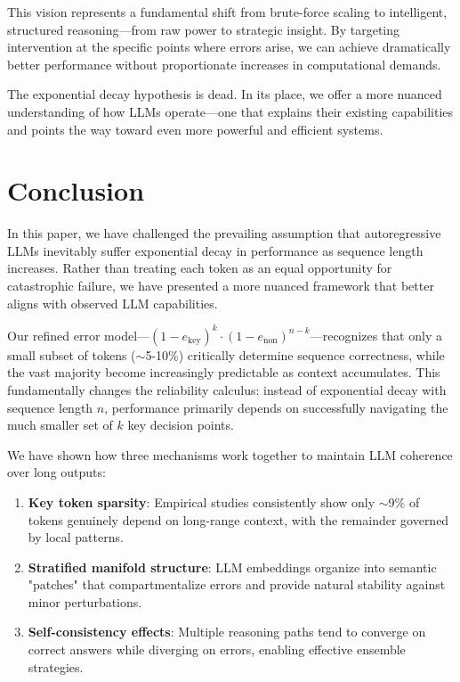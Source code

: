 \documentclass{article}
\begin{document}
This vision represents a fundamental shift from brute-force scaling to intelligent, structured reasoning—from raw power to strategic insight. By targeting intervention at the specific points where errors arise, we can achieve dramatically better performance without proportionate increases in computational demands.

The exponential decay hypothesis is dead. In its place, we offer a more nuanced understanding of how LLMs operate—one that explains their existing capabilities and points the way toward even more powerful and efficient systems.

\section{Conclusion}

In this paper, we have challenged the prevailing assumption that autoregressive LLMs inevitably suffer exponential decay in performance as sequence length increases. Rather than treating each token as an equal opportunity for catastrophic failure, we have presented a more nuanced framework that better aligns with observed LLM capabilities.

Our refined error model—$(1-e_{\text{key}})^k \cdot (1-e_{\text{non}})^{n-k}$—recognizes that only a small subset of tokens ($\sim$5-10\%) critically determine sequence correctness, while the vast majority become increasingly predictable as context accumulates. This fundamentally changes the reliability calculus: instead of exponential decay with sequence length $n$, performance primarily depends on successfully navigating the much smaller set of $k$ key decision points.

We have shown how three mechanisms work together to maintain LLM coherence over long outputs:

\begin{enumerate}
\item \textbf{Key token sparsity}: Empirical studies consistently show only $\sim$9\% of tokens genuinely depend on long-range context, with the remainder governed by local patterns.
\item \textbf{Stratified manifold structure}: LLM embeddings organize into semantic "patches" that compartmentalize errors and provide natural stability against minor perturbations.
\item \textbf{Self-consistency effects}: Multiple reasoning paths tend to converge on correct answers while diverging on errors, enabling effective ensemble strategies.
\end{enumerate}
\end{document}
